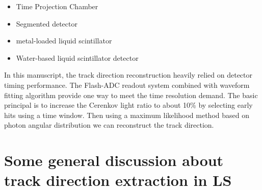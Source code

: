 \documentclass[a4paper,10pt]{cpc-hepnp}
\begin{document}
\begin{itemize}
\item Time Projection Chamber
\item Segmented detector
\item metal-loaded liquid scintillator
\item Water-based liquid scintillator detector
\end{itemize}

In this manuscript, the track direction reconstruction heavily relied on
detector timing performance. The Flash-ADC readout system combined with
waveform fitting algorithm provide one way to meet the time resolution demand.
The basic principal is to increase the Cerenkov light ratio to about 10\% by selecting early
hits using a time window. Then using a maximum
likelihood method based on photon angular distribution we can reconstruct the
track direction.

\section{Some general discussion about track direction extraction in LS}
\end{document}
